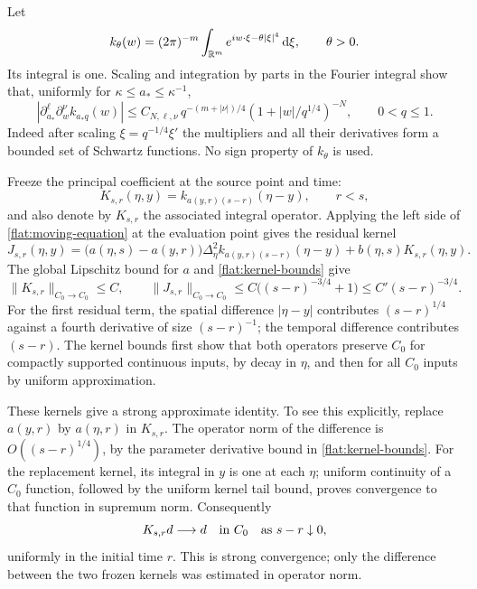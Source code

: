 Let
\[
 k_\theta(w)=(2\pi)^{-m}\int_{\mathbb{R}^m}
               e^{iw\cdot\xi-\theta|\xi|^4}\,\mathrm{d}\xi,
 \qquad \theta>0.
\]
Its integral is one. Scaling and integration by parts in the Fourier
integral show that, uniformly for $\kappa\le a_*\le\kappa^{-1}$,
\begin{equation}\label{flat:kernel-bounds}
 |\partial_{a_*}^{\ell}\partial_w^\nu k_{a_*q}(w)|
 \le C_{N,\ell,\nu}\,
 q^{-(m+|\nu|)/4}
       (1+|w|/q^{1/4})^{-N},\qquad 0<q\le1.
\end{equation}
Indeed after scaling $\xi=q^{-1/4}\xi'$ the multipliers and all their
derivatives form a bounded set of Schwartz functions. No sign property
of $k_\theta$ is used.

Freeze the principal coefficient at the source point and time:
\[
 K_{s,r}(\eta,y)=k_{a(y,r)(s-r)}(\eta-y),\qquad r<s,
\]
and also denote by $K_{s,r}$ the associated integral operator. Applying
the left side of \eqref{flat:moving-equation} at the evaluation point
gives the residual kernel
\begin{equation}\label{flat:residual}
 J_{s,r}(\eta,y)
 =\bigl(a(\eta,s)-a(y,r)\bigr)
       \Delta_\eta^2 k_{a(y,r)(s-r)}(\eta-y)
       +b(\eta,s)K_{s,r}(\eta,y).
\end{equation}
The global Lipschitz bound for $a$ and \eqref{flat:kernel-bounds} give
\begin{equation}\label{flat:residual-bound}
 \|K_{s,r}\|_{C_0\to C_0}\le C,
 \qquad
 \|J_{s,r}\|_{C_0\to C_0}
 \le C\bigl((s-r)^{-3/4}+1\bigr)
 \le C'(s-r)^{-3/4}.
\end{equation}
For the first residual term, the spatial difference $|\eta-y|$
contributes $(s-r)^{1/4}$ against a fourth derivative of size
$(s-r)^{-1}$; the temporal difference contributes $(s-r)$.
The kernel bounds first show that both operators preserve $C_0$ for
compactly supported continuous inputs, by decay in $\eta$, and then
for all $C_0$ inputs by uniform approximation.

These kernels give a strong approximate identity. To see this
explicitly, replace $a(y,r)$ by $a(\eta,r)$ in $K_{s,r}$.
The operator norm of the difference is $O((s-r)^{1/4})$, by the
parameter derivative bound in \eqref{flat:kernel-bounds}. For the
replacement kernel, its integral in $y$ is one at each $\eta$;
uniform continuity of a $C_0$ function, followed by the uniform kernel
tail bound, proves convergence to that function in supremum norm.
Consequently
\begin{equation}\label{flat:approximate-identity}
 K_{s,r}d\longrightarrow d\quad\hbox{in }C_0
 \quad\hbox{as }s-r\downarrow0,
\end{equation}
uniformly in the initial time $r$. This is strong convergence; only
the difference between the two frozen kernels was estimated in
operator norm.

